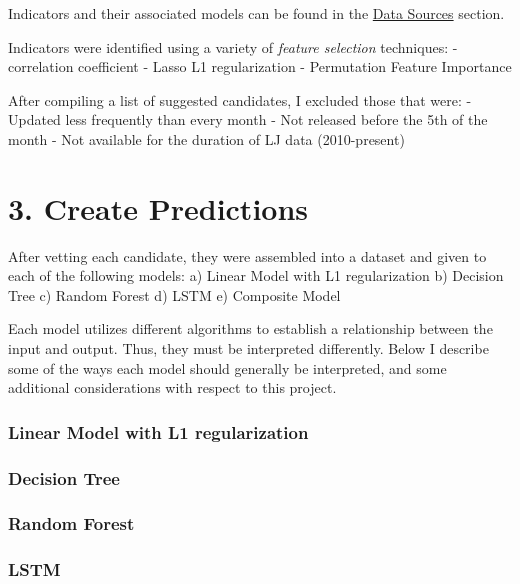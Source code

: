 \documentclass[
]{article}
\begin{document}
Indicators and their associated models can be found in the
\protect\hyperlink{Dataux5cux2520Sources}{Data Sources} section.

Indicators were identified using a variety of \emph{feature selection}
techniques: - correlation coefficient - Lasso L1 regularization -
Permutation Feature Importance

After compiling a list of suggested candidates, I excluded those that
were: - Updated less frequently than every month - Not released before
the 5th of the month - Not available for the duration of LJ data
(2010-present)

\hypertarget{create-predictions}{%
\section{3. Create Predictions}\label{create-predictions}}

After vetting each candidate, they were assembled into a dataset and
given to each of the following models: a) Linear Model with L1
regularization b) Decision Tree c) Random Forest d) LSTM e) Composite
Model

Each model utilizes different algorithms to establish a relationship
between the input and output. Thus, they must be interpreted
differently. Below I describe some of the ways each model should
generally be interpreted, and some additional considerations with
respect to this project.

\hypertarget{linear-model-with-l1-regularization}{%
\subsubsection{Linear Model with L1
regularization}\label{linear-model-with-l1-regularization}}

\hypertarget{decision-tree}{%
\subsubsection{Decision Tree}\label{decision-tree}}

\hypertarget{random-forest}{%
\subsubsection{Random Forest}\label{random-forest}}

\hypertarget{lstm}{%
\subsubsection{LSTM}\label{lstm}}
\end{document}
